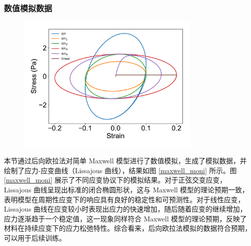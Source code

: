 \subsubsection{数值模拟数据}
\begin{figure}[htbp]
  \centering
  \includegraphics[width=0.8\textwidth]{Fig/maxwell_moni.pdf}
\end{figure}
本节通过后向欧拉法对简单 Maxwell 模型进行了数值模拟，生成了模拟数据，并绘制了应力-应变曲线（Lissajous 曲线），结果如图 \ref{maxwell_moni} 所示。图 \ref{maxwell_moni} 展示了不同应变协议下的模拟结果。对于正弦交变应变，Lissajous 曲线呈现出标准的闭合椭圆形状，这与 Maxwell 模型的理论预期一致，表明模型在周期性应变下的响应具有良好的稳定性和可预测性。对于线性应变，Lissajous 曲线在应变较小时表现出应力的快速增加，随后随着应变的继续增加，应力逐渐趋于一个稳定值，这一现象同样符合 Maxwell 模型的理论预期，反映了材料在持续应变下的应力松弛特性。综合看来，后向欧拉法模拟的数据符合预期，可以用于后续训练。


